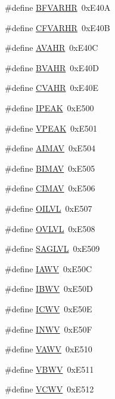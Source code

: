 \begin{DoxyCompactItemize}
\item 
\#define \hyperlink{a00036_a5de5028fa73ea84e5ee0c14945334a7a}{B\-F\-V\-A\-R\-H\-R}~0x\-E40\-A
\item 
\#define \hyperlink{a00036_ab8f3a80e1dce52d884b5a075014b9b8e}{C\-F\-V\-A\-R\-H\-R}~0x\-E40\-B
\item 
\#define \hyperlink{a00036_abf7b2fd4affddefe36eeb6297578aae7}{A\-V\-A\-H\-R}~0x\-E40\-C
\item 
\#define \hyperlink{a00036_a8b6c08ac39feb0337565bccaca6ecdbb}{B\-V\-A\-H\-R}~0x\-E40\-D
\item 
\#define \hyperlink{a00036_aa1b4960c4d08f67d76caa27f6dc7414f}{C\-V\-A\-H\-R}~0x\-E40\-E
\item 
\#define \hyperlink{a00036_a5ddcbc71d03e9945b4f454d59bb76140}{I\-P\-E\-A\-K}~0x\-E500
\item 
\#define \hyperlink{a00036_a90d5d59f51c3ee67d2578e9f1799b5ea}{V\-P\-E\-A\-K}~0x\-E501
\item 
\#define \hyperlink{a00036_a1216d73466d1d804f373b8cc7aa77bd7}{A\-I\-M\-A\-V}~0x\-E504
\item 
\#define \hyperlink{a00036_a5f9cd7017c3ef1233944970c850aaa00}{B\-I\-M\-A\-V}~0x\-E505
\item 
\#define \hyperlink{a00036_a279075dbebc70897157abb9cf29f488b}{C\-I\-M\-A\-V}~0x\-E506
\item 
\#define \hyperlink{a00036_a16c43f1bda572d5a810da2af81dfd3ff}{O\-I\-L\-V\-L}~0x\-E507
\item 
\#define \hyperlink{a00036_acceeea16d6256d808598f6191aae5601}{O\-V\-L\-V\-L}~0x\-E508
\item 
\#define \hyperlink{a00036_a12b4dc829ba25d75338dc85882a8b47d}{S\-A\-G\-L\-V\-L}~0x\-E509
\item 
\#define \hyperlink{a00036_a525259e0ba4c1cfa00935ee908bd8925}{I\-A\-W\-V}~0x\-E50\-C
\item 
\#define \hyperlink{a00036_af68641d9d0f3ee5d4ab9b220ecac7e08}{I\-B\-W\-V}~0x\-E50\-D
\item 
\#define \hyperlink{a00036_aada6da221fdbd1a9756b11959e2dd13f}{I\-C\-W\-V}~0x\-E50\-E
\item 
\#define \hyperlink{a00036_a55555ccc816198768fe973de5ca2b185}{I\-N\-W\-V}~0x\-E50\-F
\item 
\#define \hyperlink{a00036_acfb04c2e25dcd5d27eac1dbe952b076c}{V\-A\-W\-V}~0x\-E510
\item 
\#define \hyperlink{a00036_aede3d3efd022c6b37c33919e398feedc}{V\-B\-W\-V}~0x\-E511
\item 
\#define \hyperlink{a00036_aba35b37f2923547e4ef6ef81ef23c179}{V\-C\-W\-V}~0x\-E512

\end{DoxyCompactItemize}

